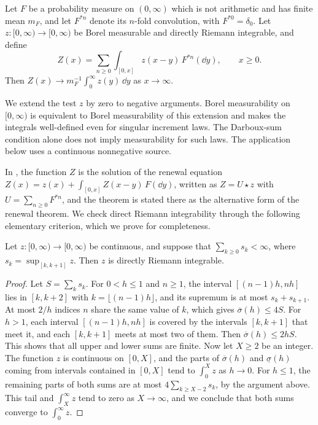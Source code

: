 \begin{theorem}\label{thm:sc-key-renewal}
Let $F$ be a probability measure on $(0,\infty)$ which is not arithmetic and has finite mean $m_F$, and let $F^{*n}$ denote its $n$-fold convolution, with $F^{*0}=\delta_0$. Let $z\colon[0,\infty)\to[0,\infty)$ be Borel measurable and directly Riemann integrable, and define
\[
 Z(x)=\sum_{n\ge0}\int_{[0,x]}z(x-y)\,F^{*n}(\dd y),\qquad x\ge0 .
\]
Then $Z(x)\to m_F^{-1}\int_0^\infty z(y)\,\dd y$ as $x\to\infty$.
\end{theorem}

We extend the test $z$ by zero to negative arguments. Borel measurability on $[0,\infty)$ is equivalent to Borel measurability of this extension and makes the integrals well-defined even for singular increment laws. The Darboux-sum condition alone does not imply measurability for such laws. The application below uses a continuous nonnegative source.

In \cite[Chapter~XI, Section~1, pp.~362--363]{feller1971}, the function $Z$ is the solution of the renewal equation $Z(x)=z(x)+\int_{[0,x]}Z(x-y)\,F(\dd y)$, written as $Z=U\star z$ with $U=\sum_{n\ge0}F^{*n}$, and the theorem is stated there as the alternative form of the renewal theorem. We check direct Riemann integrability through the following elementary criterion, which we prove for completeness.

\begin{lemma}\label{lem:sc-dri}
Let $z\colon[0,\infty)\to[0,\infty)$ be continuous, and suppose that $\sum_{k\ge0}s_k<\infty$, where $s_k=\sup_{[k,k+1]}z$. Then $z$ is directly Riemann integrable.
\end{lemma}

\begin{proof}
Let $S=\sum_ks_k$. For $0<h\le1$ and $n\ge1$, the interval $[(n-1)h,nh]$ lies in $[k,k+2]$ with $k=\lfloor(n-1)h\rfloor$, and its supremum is at most $s_k+s_{k+1}$. At most $2/h$ indices $n$ share the same value of $k$, which gives $\overline\sigma(h)\le4S$. For $h>1$, each interval $[(n-1)h,nh]$ is covered by the intervals $[k,k+1]$ that meet it, and each $[k,k+1]$ meets at most two of them. Then $\overline\sigma(h)\le2hS$. This shows that all upper and lower sums are finite. Now let $X\ge2$ be an integer. The function $z$ is continuous on $[0,X]$, and the parts of $\overline\sigma(h)$ and $\underline\sigma(h)$ coming from intervals contained in $[0,X]$ tend to $\int_0^Xz$ as $h\to0$. For $h\le1$, the remaining parts of both sums are at most $4\sum_{k\ge X-2}s_k$, by the argument above. This tail and $\int_X^\infty z$ tend to zero as $X\to\infty$, and we conclude that both sums converge to $\int_0^\infty z$.
\end{proof}

